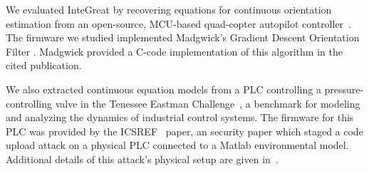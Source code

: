 We evaluated InteGreat by recovering equations for continuous orientation estimation from an open-source, MCU-based quad-copter autopilot controller~\cite{drone}. 
The firmware we studied implemented Madgwick's Gradient Descent Orientation Filter \cite{madgwick}.
Madgwick provided a C-code implementation of this algorithm in the cited publication.

We also extracted continuous equation models from a PLC controlling a pressure-controlling valve in the Tenessee Eastman Challenge~\cite{Tennessee-Eastman}, a benchmark for modeling and analyzing the dynamics of industrial control systems.
The firmware for this PLC was provided by the ICSREF~\cite{ICSREF} paper, an security paper which staged a code upload attack on a physical PLC connected to a Matlab environmental model.
Additional details of this attack's physical setup are given in~\cite{keliris2016machine}.


